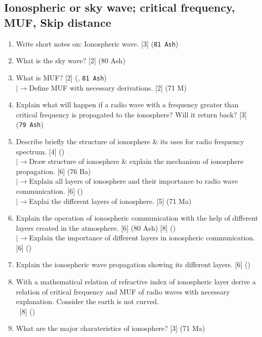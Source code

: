 \documentclass[12pt]{article}
\newcommand{\lb}{\\$\left|\rightarrow\right.$}
\newcommand{\enter}{\\\textcolor{white}{1}}
\begin{document}
  \subsection{Ionospheric or sky wave; critical frequency, MUF, Skip distance}
    \begin{enumerate}
      \item Write short notes on: Ionospheric wave. \hfill [3] (\texttt{81 Ash})

      \item What is the sky wave? \hfill [2] (80 Ash)

      \item What is MUF? \hfill [2] (, \texttt{81 Ash})
        \lb Define MUF with necessary derivations. \hfill [2] (71 M)

      \item Explain what will happen if a radio wave with a frequency greater than critical frequency is propagated to the ionosphere? Will it return back? \hfill [3] (\texttt{79 Ash})

      \item Describe briefly the structure of ionosphere \& its uses for radio frequency spectrum. \hfill [4] ()
        \lb Draw structure of ionosphere \& explain the mechanism of ionosphere propagation. \hfill [6] (76 Ba)
        \lb Explain all layers of ionosphere and their importance to radio wave communication. \hfill [6] ()
        \lb Explai the different layers of ionosphere. \hfill [5] (71 Ma)
      
      \item Explain the operation of ionospheric communication with the help of different layers created in the atmosphere. \hfill [6] (80 Ash) [8] ()
        \lb Explain the importance of different layers in ionospheric communication. \hfill [6] ()

      \item Explain the ionospheric wave propagation showing its different layers. \hfill [6] ()

      \item With a mathematical relation of refractive index of ionospheric layer derive a relation of critical frequency and MUF of radio waves with necessary explanation. Consider  the earth is not curved.
        \enter\hfill [8] ()

      \item What are the major charateristics of ionosphere? \hfill [3] (71 Ma)


\end{enumerate}
\end{document}
